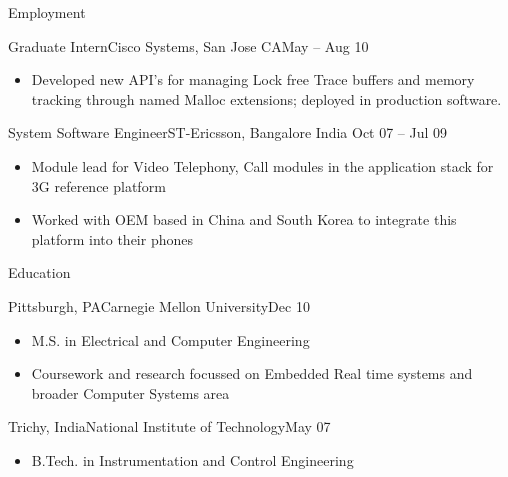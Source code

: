 \documentclass[]{mcdowellcv}
\begin{document}
\begin{cvsection}{Employment}
		\begin{cvsubsection}{Graduate Intern}{Cisco Systems, San Jose CA}{May -- Aug 10}
			\begin{itemize}
				\item Developed new API’s for managing Lock free Trace buffers and memory tracking through named Malloc extensions; deployed in production software.
			\end{itemize}
		\end{cvsubsection}

		\begin{cvsubsection}{System Software Engineer}{ST-Ericsson, Bangalore India }{Oct 07 -- Jul 09}
			\begin{itemize}
				\item Module lead for Video Telephony, Call modules in the application stack for 3G reference platform
				\item Worked with OEM based in China and South Korea to integrate this platform into their phones
			\end{itemize}
		\end{cvsubsection}

	\end{cvsection}
	
	\begin{cvsection}{Education}
		\begin{cvsubsection}{Pittsburgh, PA}{Carnegie Mellon University}{Dec 10}
			\begin{itemize}
				\item M.S. in Electrical and Computer Engineering
				\item Coursework and research focussed on Embedded Real time systems and broader Computer Systems area
			\end{itemize}
		\end{cvsubsection}
		\begin{cvsubsection}{Trichy, India}{National Institute of Technology}{May 07}
			\begin{itemize}
				\item B.Tech. in Instrumentation and Control Engineering
			\end{itemize}
		\end{cvsubsection}
	\end{cvsection}
	
\end{document}
